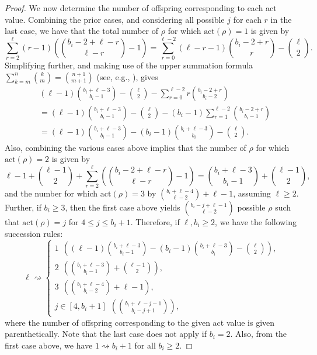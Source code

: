 \documentclass[11pt]{amsart}
\theoremstyle{plain}
\theoremstyle{definition}
\begin{document}
\begin{proof}
We now determine the number of offspring corresponding to each act value.  Combining the prior
cases, and considering all possible $j$ for each $r$ in the last case, we have that the total number
of $\rho$ for which $\text{act}(\rho)=1$ is given by
$$\sum_{r=2}^\ell
(r-1)\left(\binom{b_i-2+\ell-r}{\ell-r}-1\right)=\sum_{r=0}^{\ell-2}(\ell-r-1)\binom{b_i-2+r}{r}
-\binom{\ell}{2}.$$
Simplifying further, and making use of the upper summation formula $\sum_{k=m}^n\binom{k}{m}=\binom{n+1}{m+1}$ (see,
e.g., \cite[p.~174]{GKP}), gives
\begin{align*}
&(\ell-1)\binom{b_i+\ell-3}{b_i-1}-\binom{\ell}{2}-\sum_{r=0}^{\ell-2}r\binom{b_i-2+r}{b_i-2}\\
&=(\ell-1)\binom{b_i+\ell-3}{b_i-1}-\binom{\ell}{2}-(b_i-1)\sum_{r=1}^{\ell-2}\binom{b_i-2+r}{b_i-1}\\
&=(\ell-1)\binom{b_i+\ell-3}{b_i-1}-(b_i-1)\binom{b_i+\ell-3}{b_i}-\binom{\ell}{2}.
\end{align*}
Also, combining the various cases above implies that the number of $\rho$ for which
$\text{act}(\rho)=2$ is given by
$$\ell-1+\binom{\ell-1}{2}+\sum_{r=2}^{\ell}\left(\binom{b_i-2+\ell-r}{\ell-r}-1\right)=\binom{
b_i+\ell-3}{b_i-1}+\binom{\ell-1}{2},$$
and the number for which $\text{act}(\rho)=3$ by $\binom{b_i+\ell-4}{\ell-2}+\ell-1$, assuming $\ell
\geq 2$.  Further, if $b_i \geq 3$, then the first case above yields $\binom{b_i-j+\ell-1}{\ell-2}$
possible $\rho$ such that $\text{act}(\rho)=j$ for $4 \leq j \leq b_i+1$.  Therefore, if $\ell, b_i
\geq 2$, we have the following succession rules:
$$\ell \rightsquigarrow\begin{cases}
{\displaystyle 1~~\left((\ell-1)\binom{b_i+\ell-3}{b_i-1}-(b_i-1)\binom{b_i+\ell-3}{b_i}-\binom{\ell}{2}\right)},\\
{\displaystyle 2~~\left(\binom{b_i+\ell-3}{b_i-1}+\binom{\ell-1}{2}\right)},\\
{\displaystyle 3~~\left(\binom{b_i+\ell-4}{b_i-2}+\ell-1\right)},\\
{\displaystyle j\in[4,b_i+1]~~\left(\binom{b_i+\ell-j-1}{b_i-j+1}\right)},
\end{cases}$$
where the number of offspring corresponding to the given act value is given parenthetically.  Note
that the last case does not apply if $b_i=2$.  Also, from the first case above, we have $1
\rightsquigarrow b_i+1$ for all $b_i \geq 2$.


\end{proof}
\end{document}
